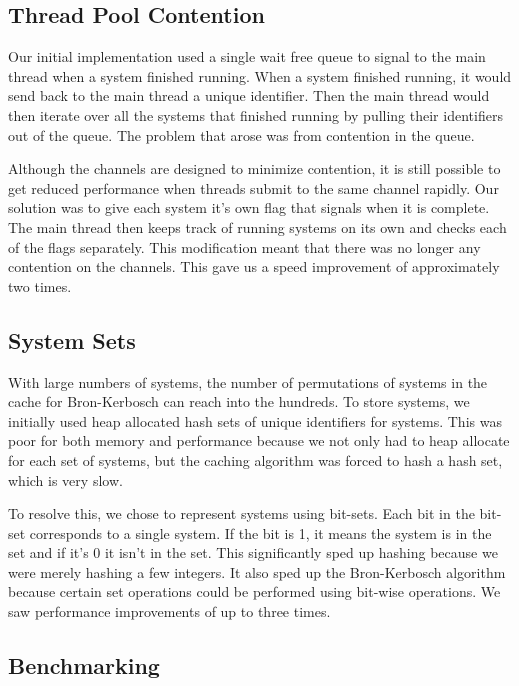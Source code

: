 \documentclass[conference]{IEEEtran}
\begin{document}
\subsection{Thread Pool Contention}

Our initial implementation used a single wait free queue to signal to the main thread when a system finished running. When a system finished running, it would send back to the main thread a unique identifier. Then the main thread would then iterate over all the systems that finished running by pulling their identifiers out of the queue. The problem that arose was from contention in the queue.

Although the channels are designed to minimize contention, it is still possible to get reduced performance when threads submit to the same channel rapidly. Our solution was to give each system it's own flag that signals when it is complete. The main  thread then keeps track of running systems on its own and checks each of the flags separately. This modification meant that there was no longer any contention on the channels. This gave us a speed improvement of approximately two times.

\subsection{System Sets}

With large numbers of systems, the number of permutations of systems in the cache for Bron-Kerbosch can reach into the hundreds. To store systems, we initially used heap allocated hash sets of unique identifiers for systems. This was poor for both memory and performance because we not only had to heap allocate for each set of systems, but the caching algorithm was forced to hash a hash set, which is very slow.

To resolve this, we chose to represent systems using bit-sets. Each bit in the bit-set corresponds to a single system. If the bit is 1, it means the system is in the set and if it's 0 it isn't in the set. This significantly sped up hashing because we were merely hashing a few integers. It also sped up the Bron-Kerbosch algorithm because certain set operations could be performed using bit-wise operations. We saw performance improvements of up to three times.

\subsection{Benchmarking}
\end{document}
